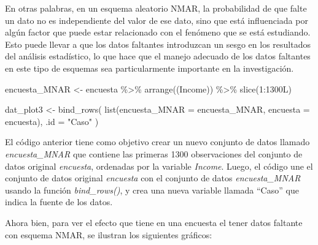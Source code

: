 \documentclass[
  12pt,
]{book}
\newenvironment{Shaded}{\begin{snugshade}}{\end{snugshade}}
\newcommand{\AttributeTok}[1]{\textcolor[rgb]{0.77,0.63,0.00}{#1}}
\newcommand{\DecValTok}[1]{\textcolor[rgb]{0.00,0.00,0.81}{#1}}
\newcommand{\FloatTok}[1]{\textcolor[rgb]{0.00,0.00,0.81}{#1}}
\newcommand{\FunctionTok}[1]{\textcolor[rgb]{0.00,0.00,0.00}{#1}}
\newcommand{\NormalTok}[1]{#1}
\newcommand{\OtherTok}[1]{\textcolor[rgb]{0.56,0.35,0.01}{#1}}
\newcommand{\SpecialCharTok}[1]{\textcolor[rgb]{0.00,0.00,0.00}{#1}}
\newcommand{\StringTok}[1]{\textcolor[rgb]{0.31,0.60,0.02}{#1}}
\begin{document}
En otras palabras, en un esquema aleatorio NMAR, la probabilidad de que falte un dato no es independiente del valor de ese dato, sino que está influenciada por algún factor que puede estar relacionado con el fenómeno que se está estudiando. Esto puede llevar a que los datos faltantes introduzcan un sesgo en los resultados del análisis estadístico, lo que hace que el manejo adecuado de los datos faltantes en este tipo de esquemas sea particularmente importante en la investigación.

\begin{Shaded}
\begin{Highlighting}[]
\NormalTok{encuesta\_MNAR }\OtherTok{\textless{}{-}}\NormalTok{ encuesta }\SpecialCharTok{\%\textgreater{}\%} 
  \FunctionTok{arrange}\NormalTok{((Income)) }\SpecialCharTok{\%\textgreater{}\%} 
  \FunctionTok{slice}\NormalTok{(}\DecValTok{1}\SpecialCharTok{:}\NormalTok{1300L)}

\NormalTok{dat\_plot3 }\OtherTok{\textless{}{-}} \FunctionTok{bind\_rows}\NormalTok{(}
  \FunctionTok{list}\NormalTok{(}\AttributeTok{encuesta\_MNAR =}\NormalTok{ encuesta\_MNAR,}
       \AttributeTok{encuesta =}\NormalTok{ encuesta), }\AttributeTok{.id =} \StringTok{"Caso"}\NormalTok{  )}
\end{Highlighting}
\end{Shaded}

El código anterior tiene como objetivo crear un nuevo conjunto de datos llamado \emph{encuesta\_MNAR} que contiene las primeras 1300 observaciones del conjunto de datos original \emph{encuesta}, ordenadas por la variable \emph{Income}. Luego, el código une el conjunto de datos original \emph{encuesta} con el conjunto de datos \emph{encuesta\_MNAR} usando la función \emph{bind\_rows()}, y crea una nueva variable llamada ``Caso'' que indica la fuente de los datos.

Ahora bien, para ver el efecto que tiene en una encuesta el tener datos faltante con esquema NMAR, se ilustran los siguientes gráficos:

\begin{Shaded}
\end{Shaded}
\end{document}
